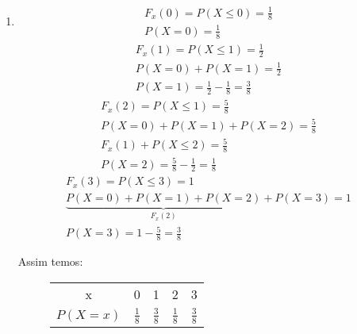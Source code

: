 \begin{description}
\begin{enumerate}[label= (\alph*)]
           \item
             \begin{align*}
               F_{x}(0)= P(X \le 0)= \frac{1}{8}\\
               P(X=0)= \frac{1}{8}
             \end{align*}
             \begin{align*}
               F_{x}(1)= P(X \le 1)= \frac{1}{2}\\
               P(X=0)+P(X=1)= \frac{1}{2} \\
               P(X=1)= \frac{1}{2}- \frac{1}{8}= \frac{3}{8}
             \end{align*}
             \begin{align*}
               F_{x}(2)= P(X \le 1)= \frac{5}{8}\\
               P(X=0)+P(X=1)+P(X=2)= \frac{5}{8}\\
               F_{x} (1) + P(X \le 2 )=\frac{5}{8}\\
               P(X=2)= \frac{5}{8}- \frac{1}{2}= \frac{1}{8}
             \end{align*}
             \begin{align*}
               F_{x}(3)= P(X \le 3)= 1\\
               \underbrace{P(X=0)+ P(X=1)+ P(X=2)}_{F_{x}(2)} + P(X=3)=1\\
               P(X =3) = 1- \frac{5}{8}= \frac{3}{8}
             \end{align*}

Assim temos:
             \begin{figure}[H]
               \centering
         \begin{tabular}{c c c c c}
           \toprule
           x&0&1&2&3\\ \cmidrule{2-5}
           $P(X=x)$&$\frac{1}{8}$&$\frac{3}{8}$&$\frac{1}{8}$&$\frac{3}{8}$\\ \bottomrule
         \end{tabular}
         \label{tab:6}
       \end{figure}
         \end{enumerate}
       \end{description}
